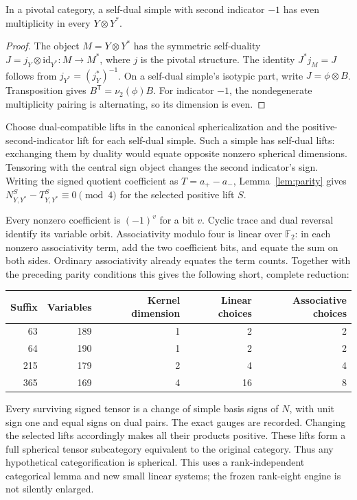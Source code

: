 \documentclass[11pt]{article}
\begin{document}
\begin{lemma}\label{lem:parity}
In a pivotal category, a self-dual simple with second indicator $-1$ has even
multiplicity in every $Y\otimes Y^*$.
\end{lemma}
\begin{proof}
The object $M=Y\otimes Y^*$ has the symmetric self-duality
$J=j_Y\otimes\mathrm{id}_{Y^*}:M\to M^*$, where $j$ is the pivotal structure.
The identity $J^*j_M=J$ follows from $j_{Y^*}=(j_Y^*)^{-1}$.
On a self-dual simple's isotypic part, write $J=\phi\otimes B$. Transposition gives
$B^{\mathsf T}=\nu_2(\phi)B$. For indicator $-1$, the nondegenerate multiplicity
pairing is alternating, so its dimension is even.
\end{proof}

Choose dual-compatible lifts in the canonical sphericalization and the
positive-second-indicator lift for each self-dual simple. Such a simple has
self-dual lifts: exchanging them by duality would equate opposite nonzero spherical
dimensions. Tensoring with the central sign object changes the second indicator's sign.
Writing the signed quotient coefficient as $T=a_+-a_-$, Lemma~\ref{lem:parity}
gives $N_{Y,Y^*}^S-T_{Y,Y^*}^S\equiv0\pmod4$ for the selected positive lift $S$.

Every nonzero coefficient is $(-1)^v$ for a bit $v$. Cyclic trace and dual reversal
identify its variable orbit. Associativity modulo four is linear over $\mathbb F_2$:
in each nonzero associativity term, add the two coefficient bits, and equate the
sum on both sides. Ordinary associativity already equates the term counts.
Together with the preceding parity conditions this gives the following short,
complete reduction:
\begin{center}\begin{tabular}{rrrrr}\toprule Suffix&Variables&Kernel dimension&Linear choices&Associative choices\\\midrule
63&189&1&2&2\\64&190&1&2&2\\215&179&2&4&4\\365&169&4&16&8\\\bottomrule\end{tabular}\end{center}
Every surviving signed tensor is a change of simple basis signs of $N$, with
unit sign one and equal signs on dual pairs. The exact gauges are recorded.
Changing the selected lifts accordingly makes all their products positive.
These lifts form a full spherical tensor subcategory equivalent to the original
category. Thus any hypothetical categorification is spherical. This uses a
rank-independent categorical lemma and new small linear systems; the frozen
rank-eight engine is not silently enlarged.
\end{document}
